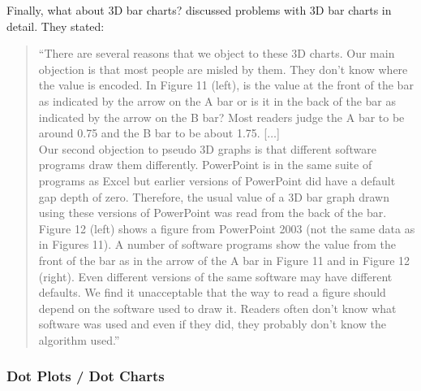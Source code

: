 \documentclass[12pt,letterpaper,final]{article}
\begin{document}
\newpage

Finally, what about 3D bar charts?
\cite{SRH2016ASA} discussed problems with 3D bar charts in detail.
They stated: 
\begin{quotation}
``There are
several reasons that we object to these 3D charts. Our main objection is that most people
are misled by them. They don't know where the value is encoded. In Figure 11 (left), is the
value at the front of the bar as indicated by the arrow on the A bar or is it in the back of the
bar as indicated by the arrow on the B bar? Most readers judge the A bar to be around 0.75
and the B bar to be about 1.75. [$\ldots$] \\
Our second objection to pseudo 3D graphs is that different software programs draw
them differently. PowerPoint is in the same suite of programs as Excel but earlier versions
of PowerPoint did have a default gap depth of zero. Therefore, the usual value of a 3D
bar graph drawn using these versions of PowerPoint was read from the back of the bar.
Figure 12 (left) shows a figure from PowerPoint 2003 (not the same data as in Figures 11).
A number of software programs show the value from the front of the bar as in the arrow
of the A bar in Figure 11 and in Figure 12 (right). Even different versions of the same
software may have different defaults. We find it unacceptable that the way to read a figure
should depend on the software used to draw it. Readers often don't know what software
was used and even if they did, they probably don't know the algorithm used.''
\end{quotation}


\newpage






\newpage


\subsubsection{Dot Plots / Dot Charts}
\end{document}
